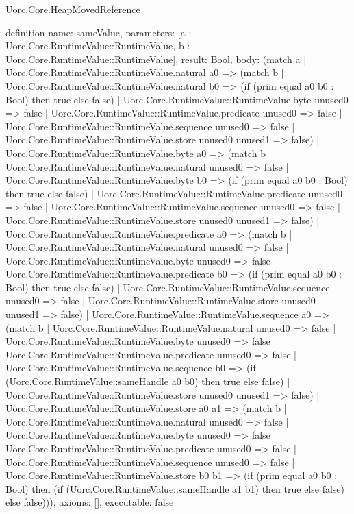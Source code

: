 \begin{lexlean}{Uorc.Core.HeapMovedReference}
\begin{semanticmodule}
definition{
  name: sameValue,
  parameters: [a : Uorc.Core.RuntimeValue::RuntimeValue, b : Uorc.Core.RuntimeValue::RuntimeValue],
  result: Bool,
  body: (match a
    | Uorc.Core.RuntimeValue::RuntimeValue.natural a0 => (match b
      | Uorc.Core.RuntimeValue::RuntimeValue.natural b0 => (if (prim equal a0 b0 : Bool) then true else false)
      | Uorc.Core.RuntimeValue::RuntimeValue.byte unused0 => false
      | Uorc.Core.RuntimeValue::RuntimeValue.predicate unused0 => false
      | Uorc.Core.RuntimeValue::RuntimeValue.sequence unused0 => false
      | Uorc.Core.RuntimeValue::RuntimeValue.store unused0 unused1 => false)
    | Uorc.Core.RuntimeValue::RuntimeValue.byte a0 => (match b
      | Uorc.Core.RuntimeValue::RuntimeValue.natural unused0 => false
      | Uorc.Core.RuntimeValue::RuntimeValue.byte b0 => (if (prim equal a0 b0 : Bool) then true else false)
      | Uorc.Core.RuntimeValue::RuntimeValue.predicate unused0 => false
      | Uorc.Core.RuntimeValue::RuntimeValue.sequence unused0 => false
      | Uorc.Core.RuntimeValue::RuntimeValue.store unused0 unused1 => false)
    | Uorc.Core.RuntimeValue::RuntimeValue.predicate a0 => (match b
      | Uorc.Core.RuntimeValue::RuntimeValue.natural unused0 => false
      | Uorc.Core.RuntimeValue::RuntimeValue.byte unused0 => false
      | Uorc.Core.RuntimeValue::RuntimeValue.predicate b0 => (if (prim equal a0 b0 : Bool) then true else false)
      | Uorc.Core.RuntimeValue::RuntimeValue.sequence unused0 => false
      | Uorc.Core.RuntimeValue::RuntimeValue.store unused0 unused1 => false)
    | Uorc.Core.RuntimeValue::RuntimeValue.sequence a0 => (match b
      | Uorc.Core.RuntimeValue::RuntimeValue.natural unused0 => false
      | Uorc.Core.RuntimeValue::RuntimeValue.byte unused0 => false
      | Uorc.Core.RuntimeValue::RuntimeValue.predicate unused0 => false
      | Uorc.Core.RuntimeValue::RuntimeValue.sequence b0 => (if (Uorc.Core.RuntimeValue::sameHandle a0 b0) then true else false)
      | Uorc.Core.RuntimeValue::RuntimeValue.store unused0 unused1 => false)
    | Uorc.Core.RuntimeValue::RuntimeValue.store a0 a1 => (match b
      | Uorc.Core.RuntimeValue::RuntimeValue.natural unused0 => false
      | Uorc.Core.RuntimeValue::RuntimeValue.byte unused0 => false
      | Uorc.Core.RuntimeValue::RuntimeValue.predicate unused0 => false
      | Uorc.Core.RuntimeValue::RuntimeValue.sequence unused0 => false
      | Uorc.Core.RuntimeValue::RuntimeValue.store b0 b1 => (if (prim equal a0 b0 : Bool) then (if (Uorc.Core.RuntimeValue::sameHandle a1 b1) then true else false) else false))),
  axioms: [],
  executable: false
}


\end{semanticmodule}
\end{lexlean}
